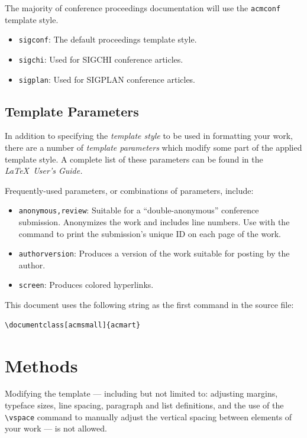 \documentclass[acmsmall, nonacm]{acmart}
\begin{document}
\begin{enumerate}
The majority of conference proceedings documentation will use the {\verb|acmconf|} template style.
\begin{itemize}
\item {\texttt{sigconf}}: The default proceedings template style.
\item{\texttt{sigchi}}: Used for SIGCHI conference articles.
\item{\texttt{sigplan}}: Used for SIGPLAN conference articles.
\end{itemize}

\subsection{Template Parameters}

In addition to specifying the {\itshape template style} to be used in
formatting your work, there are a number of {\itshape template parameters}
which modify some part of the applied template style. A complete list
of these parameters can be found in the {\itshape \LaTeX\ User's Guide.}

Frequently-used parameters, or combinations of parameters, include:
\begin{itemize}
\item {\texttt{anonymous,review}}: Suitable for a ``double-anonymous''
  conference submission. Anonymizes the work and includes line
  numbers. Use with the \texttt{\acmSubmissionID} command to print the
  submission's unique ID on each page of the work.
\item{\texttt{authorversion}}: Produces a version of the work suitable
  for posting by the author.
\item{\texttt{screen}}: Produces colored hyperlinks.
\end{itemize}

This document uses the following string as the first command in the
source file:
\begin{verbatim}
\documentclass[acmsmall]{acmart}
\end{verbatim}

\section{Methods}

Modifying the template --- including but not limited to: adjusting
margins, typeface sizes, line spacing, paragraph and list definitions,
and the use of the \verb|\vspace| command to manually adjust the
vertical spacing between elements of your work --- is not allowed.


\end{enumerate}
\end{document}
